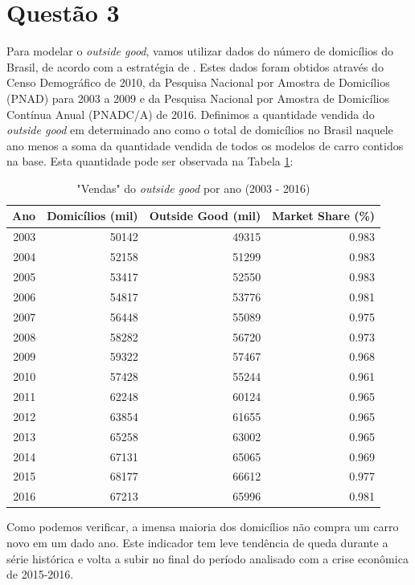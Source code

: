 \documentclass{article}
\begin{document}
\section*{Questão 3}

Para modelar o \emph{outside good}, vamos utilizar dados do número de domicílios do Brasil, de acordo com a estratégia de . Estes dados foram obtidos através do Censo Demográfico de 2010, da Pesquisa Nacional por Amostra de Domicílios (PNAD) para 2003 a 2009 e da Pesquisa Nacional por Amostra de Domicílios Contínua Anual (PNADC/A) de 2016. Definimos a quantidade vendida do \emph{outside good} em determinado ano como o total de domicílios no Brasil naquele ano menos a soma da quantidade vendida de todos os modelos de carro contidos na base. Esta quantidade pode ser observada na Tabela \ref{tab out}:

\begin{table}[H]
    \centering
\begin{tabular}{r|r|r|r}
Ano & Domicílios (mil) & Outside Good (mil) & Market Share (\%)\\
\hline\hline
2003 & 50142 & 49315 & 0.983\\
\hline
2004 & 52158 & 51299 & 0.983\\
\hline
2005 & 53417 & 52550 & 0.983\\
\hline
2006 & 54817 & 53776 & 0.981\\
\hline
2007 & 56448 & 55089 & 0.975\\
\hline
2008 & 58282 & 56720 & 0.973\\
\hline
2009 & 59322 & 57467 & 0.968\\
\hline
2010 & 57428 & 55244 & 0.961\\
\hline
2011 & 62248 & 60124 & 0.965\\
\hline
2012 & 63854 & 61655 & 0.965\\
\hline
2013 & 65258 & 63002 & 0.965\\
\hline
2014 & 67131 & 65065 & 0.969\\
\hline
2015 & 68177 & 66612 & 0.977\\
\hline
2016 & 67213 & 65996 & 0.981\\
\hline
\end{tabular}
    \caption{"Vendas" do \emph{outside good} por ano (2003 - 2016)}
    \label{tab out}
\end{table}

Como podemos verificar, a imensa maioria dos domicílios não compra um carro novo em um dado ano. Este indicador tem leve tendência de queda durante a série histórica e volta a subir no final do período analisado com a crise econômica de 2015-2016.
\end{document}
